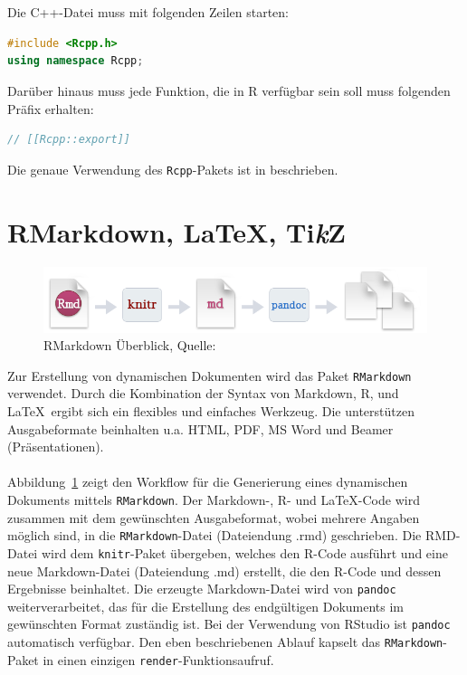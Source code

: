 \\
\\
Die C++-Datei muss mit folgenden Zeilen starten:
\begin{lstlisting}[language=C++, numbers=none, basicstyle=\ttfamily]
#include <Rcpp.h>
using namespace Rcpp;
\end{lstlisting}
Darüber hinaus muss jede Funktion, die in R verfügbar sein soll muss folgenden Präfix erhalten:
\begin{lstlisting}[language=C++, numbers=none, basicstyle=\ttfamily]
// [[Rcpp::export]]
\end{lstlisting}
Die genaue Verwendung des \texttt{Rcpp}-Pakets ist in \cite{wickham2015advanced} beschrieben.
\section{RMarkdown, \LaTeX, Ti\textit{k}Z}
\label{kapitel:rmarkdown}
\begin{figure}[t]
\centering
\includegraphics[width=\ScaleIfNeeded]{abbildungen/rmarkdown}
\caption[RMarkdown Überblick]{RMarkdown Überblick, Quelle: \cite{rmarkdown}}
\label{abb:rmarkdown}
\end{figure}
Zur Erstellung von dynamischen Dokumenten wird das Paket \texttt{RMarkdown} verwendet. Durch die Kombination der Syntax von Markdown, R, und \LaTeX\ ergibt sich ein flexibles und einfaches Werkzeug. Die unterstützen Ausgabeformate beinhalten u.a. HTML, PDF, MS Word und Beamer (Präsentationen).
\\
\\
Abbildung~\ref{abb:rmarkdown} zeigt den Workflow für die Generierung eines dynamischen Dokuments mittels \texttt{RMarkdown}. Der Markdown-, R- und \LaTeX -Code wird zusammen mit dem gewünschten Ausgabeformat, wobei mehrere Angaben möglich sind, in die \texttt{RMarkdown}-Datei (Dateiendung .rmd) geschrieben. Die RMD-Datei wird dem \texttt{knitr}-Paket übergeben, welches den R-Code ausführt und eine neue Markdown-Datei (Dateiendung .md) erstellt, die den R-Code und dessen Ergebnisse beinhaltet. Die erzeugte Markdown-Datei wird von \texttt{pandoc} weiterverarbeitet, das für die Erstellung des endgültigen Dokuments im gewünschten Format zuständig ist. Bei der Verwendung von RStudio ist \texttt{pandoc} automatisch verfügbar. Den eben beschriebenen Ablauf kapselt das \texttt{RMarkdown}-Paket in einen einzigen \texttt{render}-Funktionsaufruf.
